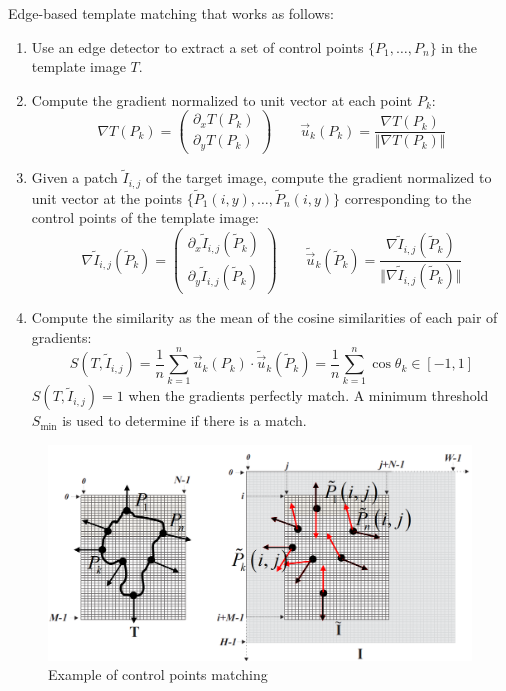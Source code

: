 Edge-based template matching that works as follows:
\begin{enumerate}
    \item Use an edge detector to extract a set of control points $\{ P_1, \dots, P_n \}$ in the template image $T$.
    \item Compute the gradient normalized to unit vector at each point $P_k$:
        \[ \nabla T(P_k) = \begin{pmatrix} \partial_x T(P_k) \\ \partial_y T(P_k) \end{pmatrix} \hspace{2em} \vec{u}_k(P_k) = \frac{\nabla T(P_k)}{\Vert \nabla T(P_k) \Vert} \]
    \item Given a patch $\tilde{I}_{i,j}$ of the target image, 
        compute the gradient normalized to unit vector at the points $\{ \tilde{P}_1(i, y), \dots, \tilde{P}_n(i, y) \}$ 
        corresponding to the control points of the template image:
        \[ 
            \nabla \tilde{I}_{i,j}(\tilde{P}_k) = \begin{pmatrix} \partial_x \tilde{I}_{i,j}(\tilde{P}_k) \\ \partial_y \tilde{I}_{i,j}(\tilde{P}_k) \end{pmatrix} \hspace{2em} 
            \tilde{\vec{u}}_k(\tilde{P}_k) = \frac{\nabla \tilde{I}_{i,j}(\tilde{P}_k)}{\Vert \nabla \tilde{I}_{i,j}(\tilde{P}_k) \Vert} 
        \]
    \item Compute the similarity as the mean of the cosine similarities of each pair of gradients:
        \[ S(T, \tilde{I}_{i,j}) = \frac{1}{n} \sum_{k=1}^{n} \vec{u}_k(P_k) \cdot \tilde{\vec{u}}_k(\tilde{P}_k) = \frac{1}{n} \sum_{k=1}^{n} \cos \theta_k \in [-1, 1] \]
        $S(T, \tilde{I}_{i,j}) = 1$ when the gradients perfectly match. A minimum threshold $S_\text{min}$ is used to determine if there is a match.
\end{enumerate}

\begin{figure}[H]
    \centering
    \includegraphics[width=0.5\linewidth]{./img/shape_based_matching.png}
    \caption{Example of control points matching}
\end{figure}


